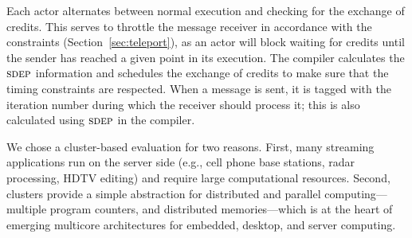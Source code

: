 Each actor alternates between normal execution and checking for the
exchange of credits.  This serves to throttle the message receiver in
accordance with the constraints (Section~\ref{sec:teleport}), as an
actor will block waiting for credits until the sender has reached a
given point in its execution.  The compiler calculates the $\textsc{sdep}$
information and schedules the exchange of credits to make sure that
the timing constraints are respected.  When a message is sent, it is
tagged with the iteration number during which the receiver should
process it; this is also calculated using $\textsc{sdep}$ in the compiler.




We chose a cluster-based evaluation for two reasons.  First, many
streaming applications run on the server side (e.g., cell phone base
stations, radar processing, HDTV editing) and require large
computational resources. Second, clusters provide a simple abstraction
for distributed and parallel computing---multiple program counters,
and distributed memories---which is at the heart of emerging
multicore architectures for embedded, desktop, and server computing.

